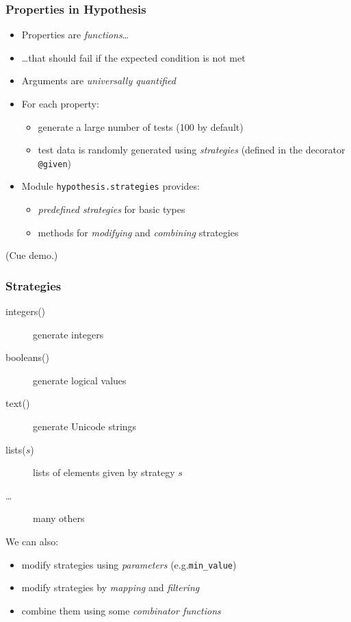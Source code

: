 \documentclass{beamer}
\begin{document}
\begin{frame}
  \frametitle{Properties in Hypothesis}

  \begin{itemize}
  \item Properties are \emph{functions}\ldots
  \item \ldots that should fail if the expected condition is not met
  \item Arguments are \emph{universally quantified}
  \item For each property:
    \begin{itemize}
  \item generate a large number of tests (100 by default)
  \item test data is randomly generated using \emph{strategies}
  (defined in the decorator \texttt{@given})
    \end{itemize}
  \item Module \texttt{hypothesis.strategies} provides:
    \begin{itemize}
    \item \emph{predefined strategies} for basic types
    \item methods for \emph{modifying} and \emph{combining} strategies
    \end{itemize}
  \end{itemize}
\bigskip

  \hfill (Cue demo.)
\end{frame}



\begin{frame}
  \frametitle{Strategies}

  \begin{description}
  \item[integers()] generate integers
  \item[booleans()] generate logical values 
  \item[text()] generate Unicode strings
  \item[lists($s$)] lists of elements given by strategy $s$
    \item[\ldots] many others
  \end{description}
  \bigskip
  
  We can also:
  \begin{itemize}
  \item modify strategies using \emph{parameters} (e.g.\@ \texttt{min\_value})
  \item modify strategies by \emph{mapping} and \emph{filtering}
  \item combine them using some \emph{combinator functions}
  \end{itemize} 
\end{frame}
\end{document}

